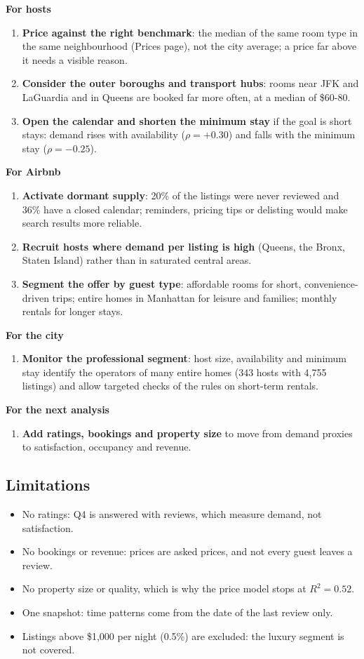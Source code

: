 \documentclass[12pt,a4paper]{article}
\begin{document}
\textbf{For hosts}
\begin{enumerate}
\item \textbf{Price against the right benchmark}: the median of the same room type in the same
neighbourhood (Prices page), not the city average; a price far above it needs a visible reason.
\item \textbf{Consider the outer boroughs and transport hubs}: rooms near JFK and LaGuardia and in
Queens are booked far more often, at a median of \$60-80.
\item \textbf{Open the calendar and shorten the minimum stay} if the goal is short stays: demand rises
with availability ($\rho = +0.30$) and falls with the minimum stay ($\rho = -0.25$).
\end{enumerate}
\textbf{For Airbnb}
\begin{enumerate}[resume]
\item \textbf{Activate dormant supply}: 20\% of the listings were never reviewed and 36\% have a closed
calendar; reminders, pricing tips or delisting would make search results more reliable.
\item \textbf{Recruit hosts where demand per listing is high} (Queens, the Bronx, Staten Island) rather
than in saturated central areas.
\item \textbf{Segment the offer by guest type}: affordable rooms for short, convenience-driven trips;
entire homes in Manhattan for leisure and families; monthly rentals for longer stays.
\end{enumerate}
\textbf{For the city}
\begin{enumerate}[resume]
\item \textbf{Monitor the professional segment}: host size, availability and minimum stay identify the
operators of many entire homes (343 hosts with 4{,}755 listings) and allow targeted checks of the rules
on short-term rentals.
\end{enumerate}
\textbf{For the next analysis}
\begin{enumerate}[resume]
\item \textbf{Add ratings, bookings and property size} to move from demand proxies to satisfaction,
occupancy and revenue.
\end{enumerate}

\subsection*{Limitations}
\begin{itemize}
\item No ratings: Q4 is answered with reviews, which measure demand, not satisfaction.
\item No bookings or revenue: prices are asked prices, and not every guest leaves a review.
\item No property size or quality, which is why the price model stops at $R^2 = 0.52$.
\item One snapshot: time patterns come from the date of the last review only.
\item Listings above \$1{,}000 per night (0.5\%) are excluded: the luxury segment is not covered.
\end{itemize}
\end{document}
